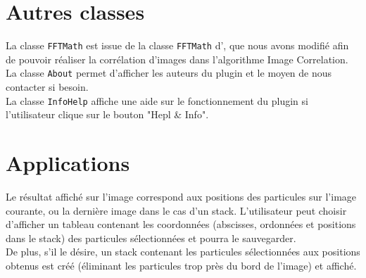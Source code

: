\section{Autres classes}

La classe \texttt{FFTMath} est issue de la classe \texttt{FFTMath} d'\imj, que nous avons modifié afin de pouvoir réaliser la corrélation d'images dans l'algorithme Image Correlation. \\

La classe \texttt{About} permet d'afficher les auteurs du plugin et le moyen de nous contacter si besoin. \\

La classe \texttt{InfoHelp} affiche une aide sur le fonctionnement du plugin si l'utilisateur  clique sur le bouton "Hepl & Info". 


\section{Applications}

Le résultat affiché sur l'image correspond aux positions des particules sur l'image courante, ou la dernière image dans le cas d'un stack.
L'utilisateur peut choisir d'afficher un tableau contenant les coordonnées (abscisses, ordonnées et positions dans le stack) des particules sélectionnées et pourra le sauvegarder. \\
De plus, s'il le désire, un stack contenant les particules sélectionnées aux positions obtenus est créé (éliminant les particules trop près du bord de l'image) et affiché.

